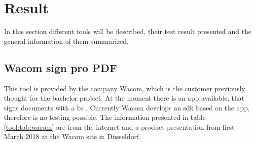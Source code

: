 \section{Result}
In this section different tools will be described, their test result presented and the general information of them summarized.

\subsection{Wacom sign pro PDF}
This tool is provided by the company Wacom, which is the customer previously thought for the bachelor project. At the moment there is an \gls{app} available, that signs documents with a \gls{bs} \parencite{wacom2018pdf}. Currently Wacom develops an \gls{sdk} based on the \gls{app}, therefore is no testing possible. The information presented in table \ref{tool:tab:wacom} are from the internet and a product presentation from first March 2018 at the Wacom site in Düsseldorf. \newline
